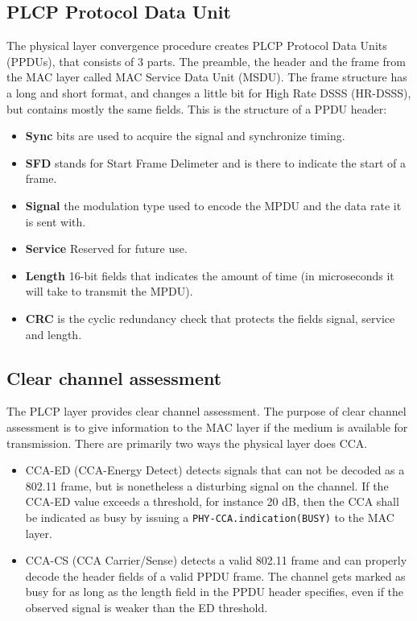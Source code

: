 	\subsection{PLCP Protocol Data Unit}
	The physical layer convergence procedure creates PLCP Protocol Data Units (PPDUs), 
	that consists of 3 parts. The preamble, the header and the frame from the MAC layer
	called MAC Service Data Unit (MSDU). The frame structure
	has a long and short format, and changes a little bit for High Rate DSSS (HR-DSSS),
	but contains mostly the same fields. This is the structure of a PPDU header:



	\begin{itemize}
	\item \textbf{Sync} bits are used to acquire the signal and synchronize timing. 
	\item \textbf{SFD} stands for Start Frame Delimeter and is there to indicate the start of a frame.  
	\item \textbf{Signal} the modulation type used to encode the MPDU and
	the data rate it is sent with. 
	\item \textbf{Service} Reserved for future use. 
	\item \textbf{Length} 16-bit fields that indicates the amount of time (in
			microseconds it will take to transmit the MPDU).
	\item \textbf{CRC} is the cyclic redundancy check that protects
	the fields signal, service and length. 
	\end{itemize}

	\subsection{Clear channel assessment}
	The PLCP layer provides clear channel assessment.
	The purpose of clear channel assessment is to give information to the MAC
	layer if the medium is available for transmission. There
	are primarily two ways the physical layer does CCA.
	\begin{itemize}
	\item CCA-ED (CCA-Energy Detect) detects signals that can not be decoded as a 802.11 frame, but is nonetheless a disturbing signal on the channel. If the CCA-ED value
	exceeds a threshold, for instance 20 dB, then the CCA shall be indicated as
	busy by issuing a \verb|PHY-CCA.indication(BUSY)| to the MAC layer.  
	\item CCA-CS (CCA Carrier/Sense) detects a valid 802.11 frame and can
	properly decode the header fields of a valid PPDU frame.
	The channel gets marked as busy for as long as the length
	field in the PPDU header specifies, even if the observed
	signal is weaker than the ED threshold. 
	\end{itemize}

